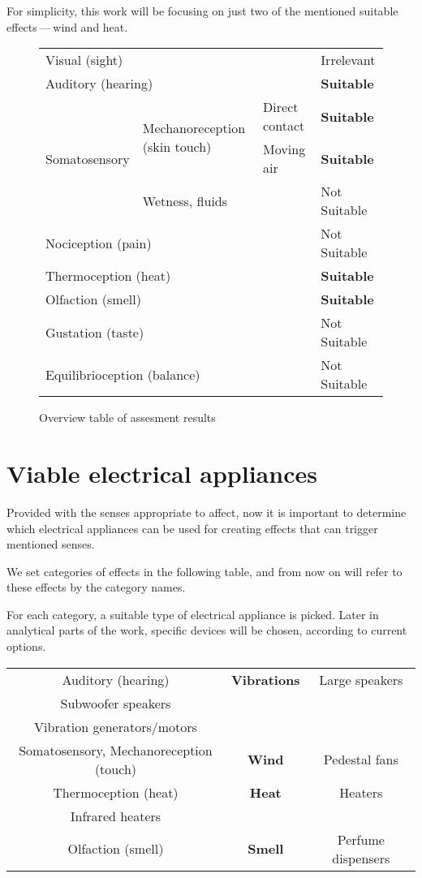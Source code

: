 For simplicity, this work will be focusing on just two of the mentioned suitable
effects — wind and heat.

\begin{center}
\begin{figure}
\begin{tabular}{|l|l|l|l|}
\hline
\multicolumn{3}{|l|}{Visual (sight)} & Irrelevant \\ 
\multicolumn{3}{|l|}{Auditory (hearing)} & \textbf{Suitable} \\ 
\multirow{3}{*}{Somatosensory} & \multirow{2}{*}{Mechanoreception (skin touch)}  & Direct contact & \textbf{Suitable} \\ 
& & Moving air & \textbf{Suitable} \\ 
& \multicolumn{2}{|l|}{Wetness, fluids} & Not Suitable \\ 
\multicolumn{3}{|l|}{Nociception (pain)} & Not Suitable \\ 
\multicolumn{3}{|l|}{Thermoception (heat)} & \textbf{Suitable} \\ 
\multicolumn{3}{|l|}{Olfaction (smell)} & \textbf{Suitable} \\ 
\multicolumn{3}{|l|}{Gustation (taste)} & Not Suitable \\ 
\multicolumn{3}{|l|}{Equilibrioception (balance)} & Not Suitable \\ 
\hline
\end{tabular}
\caption{Overview table of assesment results}
\end{figure}
\end{center}


\hypertarget{x-viable-electrical-appliances}{\section{Viable electrical appliances}}
Provided with the senses appropriate to affect, now it is important to determine
which electrical appliances can be used for creating effects that can trigger mentioned senses.


We set categories of effects in the following table, and from now on will
refer to these effects by the category names.


For each category, a suitable type of electrical appliance is picked. Later in
analytical parts of the work, specific devices will be chosen, according to
current options.


\begin{center}
\begin{tabular}{|c|c|c|}
\hline
Auditory (hearing) & \textbf{Vibrations} & Large speakers \\ 
Subwoofer speakers \\ 
Vibration generators/motors \\ 
Somatosensory, Mechanoreception (touch) & \textbf{Wind} & Pedestal fans \\ 
Thermoception (heat) & \textbf{Heat} & Heaters \\ 
Infrared heaters \\ 
Olfaction (smell) & \textbf{Smell} & Perfume dispensers \\ 
\hline
\end{tabular}
\end{center}

